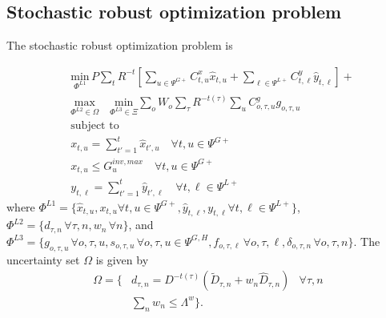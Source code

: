 \documentclass[final]{IEEEtran}
\begin{document}
\subsection{Stochastic robust optimization problem}

The stochastic robust optimization problem is

\begin{align}
&\label{saro_obj} \underset{\Phi^{L1}}{\text{min}} \, P \sum\limits_{t} R^{-t} \left[ \sum\limits_{u \in \Psi^{G+}} C^x_{t, u} \hat{x}_{t, u} + \sum\limits_{\ell \in \Psi^{L+}} C^y_{t, \ell} \hat{y}_{t, \ell} \right] +  \\
&\underset{\Phi^{L2} \in \Omega}{\text{max}} \quad \underset{\Phi^{L3} \in \Xi}{\text{min}} \sum\limits_o W_o \sum\limits_{\tau} R^{-t(\tau)} \sum\limits_{u} C^g_{o, \tau, u} g_{o, \tau, u} \\
&\text{subject to} \nonumber \\
&\label{master_constraint_first} x_{t, u} = \sum\limits_{t' = 1}^{t} \hat{x}_{t', u} 	\quad \forall t, u \in \Psi^{G+} \\
&x_{t, u} \leq G^{inv, max}_u \quad \forall t, u \in \Psi^{G+} \\
&\label{master_constraint_last} y_{t, \ell} = \sum\limits_{t' = 1}^{t} \hat{y}_{t', \ell} 	\quad \forall t, \ell \in \Psi^{L+}
\end{align}
where $\Phi^{L1} = \{ \hat{x}_{t, u}, x_{t, u} \forall t, u \in \Psi^{G+}, \hat{y}_{t, \ell}, y_{t, \ell} \forall t, \ell \in \Psi^{L+} \}$, $\Phi^{L2} = \{ d_{\tau, n} \, \forall \tau, n, w_{n} \, \forall n \}$, and $\Phi^{L3} = \{ g_{o, \tau, u} \, \forall o, \tau, u, s_{o, \tau, u} \, \forall o, \tau, u \in \Psi^{G, H}, f_{o, \tau, \ell} \, \forall o, \tau, \ell, \delta_{o, \tau, n} \, \forall o, \tau, n \}$. The uncertainty set $\Omega$ is given by
\begin{align}
\Omega = \{ &d_{\tau, n} = D^{-t(\tau)} (\tilde{D}_{\tau, n} + w_n \hat{D}_{\tau, n}) & \forall \tau, n \nonumber \\
&\label{uncertainty_set}\sum\limits_n w_{n} \leq \Lambda^w \}.
\end{align}
\end{document}
